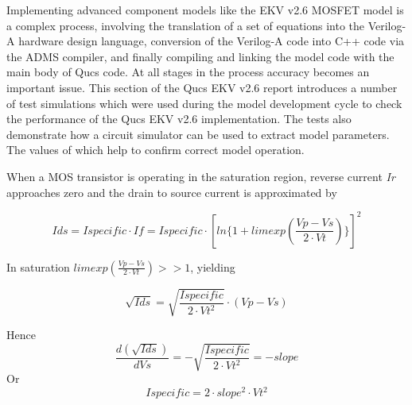 Implementing advanced component models like the EKV v2.6 MOSFET model
is a complex process, involving the translation of a set of equations
into the Verilog-A hardware design language, conversion of the
Verilog-A code into C++ code via the ADMS compiler, and finally
compiling and linking the model code with the main body of Qucs
code. At all stages in the process accuracy becomes an important
issue. This section of the Qucs EKV v2.6 report introduces a number of
test simulations which were used during the model development cycle to
check the performance of the Qucs EKV v2.6 implementation.  The tests
also demonstrate how a circuit simulator can be used to extract model
parameters. The values of which help to confirm correct model
operation.


When a MOS transistor is operating in the saturation region, reverse
current \textit{Ir} approaches zero and the drain to source current is
approximated by

\hspace{20mm}     \begin{equation}
              Ids = Ispecific \cdot If = Ispecific \cdot \left[ ln\lbrace  1+limexp\left( \dfrac{Vp-Vs}{2 \cdot Vt} \right) \rbrace  \right]^{2} 
                  \end{equation}  



In saturation $limexp\left( \frac{Vp-Vs}{2 \cdot Vt} \right) >> 1$,
yielding

\hspace{20mm}     \begin{equation}
			\sqrt{Ids} = \sqrt{\dfrac{Ispecific}{2 \cdot Vt^{2}}} \cdot \left( Vp-Vs\right) 
                  \end{equation}  

Hence   
\hspace{20mm}     \begin{equation}
			\dfrac{d(\sqrt{Ids})}{dVs} = -\sqrt{\dfrac{Ispecific}{2 \cdot Vt^{2}}} = -slope
                  \end{equation}  
Or 
\hspace{20mm}     \begin{equation}
			Ispecific = 2 \cdot slope^{2} \cdot Vt^{2}
                  \end{equation}  

